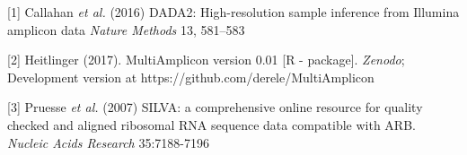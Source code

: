 \documentclass[30pt, a0paper, portrait, margin=0mm, innermargin=15mm,
               blockverticalspace=15mm, colspace=15mm, subcolspace=8mm]{tikzposter}
\begin{document}
\begin{columns}
{\begin{small}
          \hangindent=2cm [1] Callahan \textit{et al.} (2016) DADA2:
          High-resolution sample inference from Illumina amplicon data
          \textit{Nature Methods} 13, 581--583

          \hangindent=2cm [2] Heitlinger (2017). MultiAmplicon version
          0.01 [R - package]. \textit{Zenodo}; Development version at
          https://github.com/derele/MultiAmplicon

          \hangindent=2cm [3] Pruesse \textit{et al.} (2007) SILVA: a
          comprehensive online resource for quality checked and
          aligned ribosomal RNA sequence data compatible with
          ARB. \textit{Nucleic Acids Research} 35:7188-7196

          
        \end{small}
      }


\end{columns}

\end{document}
